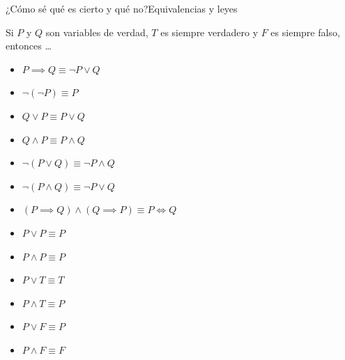 \documentclass[spanish, c]{beamer}
\begin{document}
\begin{frame}{¿Cómo sé qué es cierto y qué no?}{Equivalencias y leyes}

    Si $P$ y $Q$ son variables de verdad, $T$ es siempre verdadero y $F$ es siempre falso, entonces \dots \pause

    \begin{itemize}[<+->]
        \item $P \implies Q \equiv \neg P \vee Q$
        \item $\neg(\neg P) \equiv P$
        \item $Q \vee P \equiv P \vee Q$
        \item $Q \wedge P \equiv P \wedge Q$
        \item $\neg(P \vee Q) \equiv \neg P \wedge Q$
        \item $\neg(P \wedge Q) \equiv \neg P \vee Q$
        \item $(P \implies Q) \wedge (Q \implies P) \equiv P \iff Q$
        \item $P \vee P \equiv P$
        \item $P \wedge P \equiv P$
        \item $P \vee T \equiv T$
        \item $P \wedge T \equiv P$
        \item $P \vee F \equiv P$
        \item $P \wedge F \equiv F$
    \end{itemize}

\end{frame}




\end{document}
